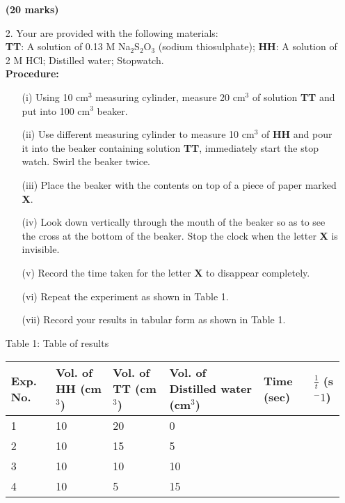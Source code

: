 \begin{enumerate}
\begin{enumerate}
\end{enumerate}
\raggedleft \textbf{(20 marks)}

\raggedright

\item[2.] Your are provided with the following materials:\\
\textbf{TT}:  A solution of 0.13 M Na$_2$S$_2$O$_3$ (sodium thiosulphate);
\textbf{HH}:  A solution of 2 M HCl;
Distilled water;
Stopwatch.\\

\textbf{Procedure:}\\
\begin{enumerate}
\item[(i)] Using 10 cm$^3$ measuring cylinder, measure 20 cm$^3$ of solution \textbf{TT} and put into 100 cm$^3$ beaker.
\item[(ii)] Use different measuring cylinder to measure 10 cm$^3$ of \textbf{HH} and pour it into the beaker containing solution \textbf{TT}, immediately start the stop watch. Swirl the beaker twice.
\item[(iii)] Place the beaker with the contents on top of a piece of paper marked \textbf{X}.
\item[(iv)] Look down vertically through the mouth of the beaker so as to see the cross at the bottom of the beaker. Stop the clock when the letter \textbf{X} is invisible.
\item[(v)] Record the time taken for the letter \textbf{X} to disappear completely.
\item[(vi)] Repeat the experiment as shown in Table 1.
\item[(vii)] Record your results in tabular form as shown in Table 1.
\end{enumerate}

\indent Table 1: Table of results\\

\begin{center}
\begin{tabular}{|p{2cm}|p{2cm}|p{2cm}|p{2cm}|p{2.5cm}|p{2cm}|}
\hline
Exp. No.&Vol. of \textbf{HH} (cm$^3$)&Vol. of \textbf{TT} (cm$^3$)&Vol. of Distilled water (cm$^3$)&Time (sec)&$\frac{1}{t}$ (s$^-1$)\\ \hline
1&10&20&0&&\\ \hline
2&10&15&5&&\\ \hline
3&10&10&10&&\\ \hline
4&10&5&15&&\\ \hline
\end{tabular}
\end{center}


\end{enumerate}
